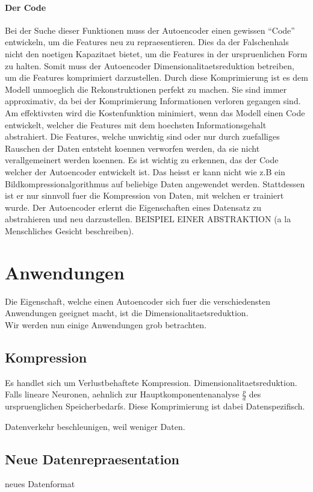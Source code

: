 \paragraph{Der Code}
Bei der Suche dieser Funktionen muss der Autoencoder einen gewissen ``Code''
entwickeln, um die Features neu zu repraesentieren. Dies da der Falschenhals
nicht den noetigen Kapazitaet bietet, um die Features in der urspruenlichen Form
zu halten. Somit muss der Autoencoder Dimensionalitaetsreduktion betreiben, um
die Features komprimiert darzustellen.
\para{}
Durch diese Komprimierung ist es dem Modell unmoeglich die Rekonstruktionen
perfekt zu machen. Sie sind immer approximativ, da bei der Komprimierung
Informationen verloren gegangen sind. Am effektivsten wird die Kostenfunktion
minimiert, wenn das Modell einen Code entwickelt, welcher die Features mit dem
hoechsten Informationsgehalt abstrahiert. Die Features, welche unwichtig sind
oder nur durch zuefalliges Rauschen der Daten entsteht koennen verworfen werden,
da sie nicht verallgemeinert werden koennen.
\para{}
Es ist wichtig zu erkennen, das der Code welcher der Autoencoder entwickelt
 ist. Das heisst er kann nicht wie z.B ein
Bildkompressionalgorithmus auf beliebige Daten angewendet werden. Stattdessen
ist er nur sinnvoll fuer die Kompression von Daten, mit welchen er trainiert
wurde. Der Autoencoder erlernt die Eigenschaften eines Datensatz zu abstrahieren
und neu darzustellen.
BEISPIEL EINER ABSTRAKTION (a la Menschliches Gesicht beschreiben).

\section{Anwendungen}
Die Eigenschaft, welche einen Autoencoder sich fuer die verschiedensten
Anwendungen geeignet macht, ist die Dimensionalitaetsreduktion. \\
Wir werden nun einige Anwendungen grob betrachten.

\subsection{Kompression}
Es handlet sich um Verlustbehaftete Kompression.
Dimensionalitaetsreduktion. Falls lineare Neuronen, aehnlich zur Hauptkomponentenanalyse
$\frac{p}{d}$ des urspruenglichen Speicherbedarfs. Diese Komprimierung ist dabei Datenspezifisch.

Datenverkehr beschleunigen, weil weniger Daten.

\subsection{Neue Datenrepraesentation}
neues Datenformat

